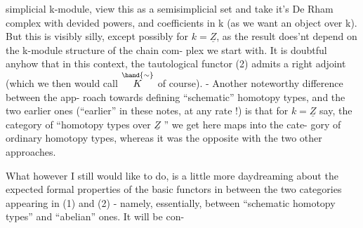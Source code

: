 simplicial k-module,  view this as a semisimplicial set and take it's
De Rham complex with devided powers,  and coefficients in k (as we want
an object over k).  But this is visibly silly,  except possibly for $k=\underline{Z}$,
as the result does'nt depend on the k-module structure of the chain com-%
plex we start with.  It is doubtful anyhow that in this context,  the
tautological functor (2) admits a right adjoint (which we then would call
$\overset{\hand{\sim}}{K}$  of course). - Another noteworthy difference between the  app-%
roach towards defining ``schematic'' homotopy types,  and the two earlier
ones (``earlier'' in these notes, at any rate !)  is that for $k=\underline{Z}$ say,
the category of ``homotopy types over $\underline{Z}$ '' we get here maps into the cate-%
gory of ordinary homotopy types,  whereas it was the opposite with the
two other approaches.

What however I still would like to do,  is a little more daydreaming
about the expected formal properties of the basic functors in between
the two categories appearing in (1) and (2)  - namely,  essentially,
between ``schematic homotopy types''  and ``abelian'' ones.  It will be con-%

